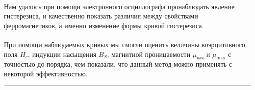 \documentclass[a4paper,12pt]{article} %
\begin{document}
\paragraph{} Нам удалось при помощи электронного осциллографа пронаблюдать явление гистерезиса, и качественно показать различия между свойствами ферромагнетиков, а именно изменение формы кривой гистерезиса.

\paragraph{} При помощи наблюдаемых кривых мы смогли оценить величины коэрцитивного поля $H_c$, индукции насыщения $B_S$, магнитной проницаемости $\mu_\text{нач}$ и $\mu_\text{max}$ с точностью до порядка, чем показали, что данный метод можно применять с некоторой эффективностью.


\medskip\hrule\medskip
\end{document}
